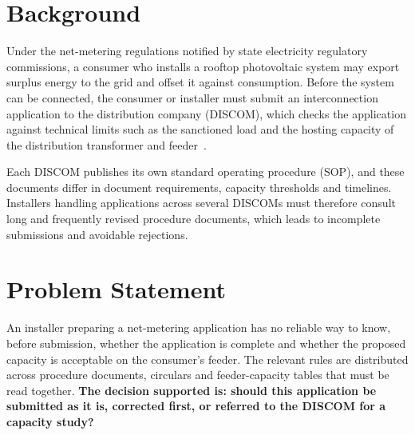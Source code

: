 \documentclass[12pt,a4paper,oneside]{report}
\newif\ifguidance
\newcommand{\guide}[1]{%
  \ifguidance
  \begin{tcolorbox}[enhanced,breakable,colback=guidebg,colframe=bmsblue,
    boxrule=0.6pt,arc=2pt,left=6pt,right=6pt,top=4pt,bottom=4pt,
    fonttitle=\bfseries\small,title={What to write here},
    before upper={\small\setstretch{1.1}}]
  #1
  \end{tcolorbox}
  \fi}
\newcommand{\dodont}[2]{%
  \ifguidance
  \begin{tcolorbox}[enhanced,breakable,sidebyside,sidebyside align=top seam,
    colback=dobg,colbacklower=dontbg,colframe=gray!60,boxrule=0.5pt,arc=2pt,
    lefthand ratio=0.5,left=5pt,right=5pt,top=4pt,bottom=4pt,
    fontupper=\small\setstretch{1.05},fontlower=\small\setstretch{1.05}]
  \textbf{\textcolor{ForestGreen}{\checkmark\ Do}}
  \begin{itemize}[leftmargin=12pt,itemsep=1pt,topsep=2pt]#1\end{itemize}
  \tcblower
  \textbf{\textcolor{BrickRed}{$\times$ Don't}}
  \begin{itemize}[leftmargin=12pt,itemsep=1pt,topsep=2pt]#2\end{itemize}
  \end{tcolorbox}
  \fi}
\newenvironment{sample}
  {\par\noindent{\footnotesize\bfseries\textcolor{BrickRed}{[SAMPLE --- replace with your own content]}}\par\color{samplecol}}
  {\par\medskip}
\begin{document}
\section{Background}
\guide{Describe the sector and the real-world process in which your problem occurs. Give one or two
facts with citations that show the problem matters (volume, cost, delay, risk). Two to three
paragraphs.}
\dodont{\item Start from the real-world setting, not from LLMs.
\item Support every factual claim with a citation.}
{\item Do not open with ``In today's fast-paced world'' or ``AI is changing everything''.
\item Do not write a general history of artificial intelligence.}
\begin{sample}
Under the net-metering regulations notified by state electricity regulatory commissions, a consumer
who installs a rooftop photovoltaic system may export surplus energy to the grid and offset it
against consumption. Before the system can be connected, the consumer or installer must submit an
interconnection application to the distribution company (DISCOM), which checks the application
against technical limits such as the sanctioned load and the hosting capacity of the distribution
transformer and feeder~\cite{example-sop}.

Each DISCOM publishes its own standard operating procedure (SOP), and these documents differ in
document requirements, capacity thresholds and timelines. Installers handling applications across
several DISCOMs must therefore consult long and frequently revised procedure documents, which leads
to incomplete submissions and avoidable rejections.
\end{sample}

\section{Problem Statement}
\guide{State the problem in one precise paragraph, ending with a single sentence in bold that names
the decision the agent supports. The problem must be specific enough that a reader can tell whether
your system solves it.}
\dodont{\item Name the user, the input, the output and the decision.
\item Keep it to one paragraph.}
{\item Do not state a vague goal (``to use AI to improve solar adoption'').
\item Do not describe your solution here.}
\begin{sample}
An installer preparing a net-metering application has no reliable way to know, before submission,
whether the application is complete and whether the proposed capacity is acceptable on the
consumer's feeder. The relevant rules are distributed across procedure documents, circulars and
feeder-capacity tables that must be read together.
\textbf{The decision supported is: should this application be submitted as it is, corrected first,
or referred to the DISCOM for a capacity study?}
\end{sample}
\end{document}
